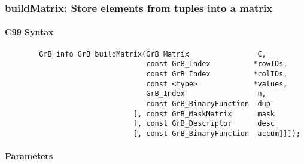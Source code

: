 \subsubsection{{\sf buildMatrix}: Store elements from tuples into a matrix}


\paragraph{C99 Syntax}

\begin{verbatim}
        GrB_info GrB_buildMatrix(GrB_Matrix                C,
                                 const GrB_Index          *rowIDs,
                                 const GrB_Index          *colIDs, 
                                 const <type>             *values,
                                 GrB_Index                 n,
                                 const GrB_BinaryFunction  dup
                              [, const GrB_MaskMatrix      mask
                              [, const GrB_Descriptor      desc
                              [, const GrB_BinaryFunction  accum]]]);
\end{verbatim}

\paragraph{Parameters}


